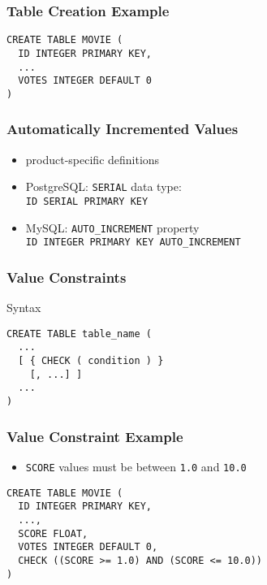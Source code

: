 \documentclass[dvipsnames]{beamer}
\theoremstyle{plain}
\begin{document}
\begin{frame}[fragile]
  \frametitle{Table Creation Example}

  \begin{example}
    \begin{lstlisting}
CREATE TABLE MOVIE (
  ID INTEGER PRIMARY KEY,
  ...
  VOTES INTEGER DEFAULT 0
)
    \end{lstlisting}
  \end{example}
\end{frame}

\begin{frame}[fragile]
  \frametitle{Automatically Incremented Values}

  \begin{itemize}
    \item product-specific definitions

    \bigskip
    \item PostgreSQL: \texttt{SERIAL} data type:\\
      \lstinline!ID SERIAL PRIMARY KEY!

    \smallskip
    \item MySQL: \texttt{AUTO\_INCREMENT} property\\
      \lstinline!ID INTEGER PRIMARY KEY AUTO_INCREMENT!
  \end{itemize}
\end{frame}

\begin{frame}[fragile]
  \frametitle{Value Constraints}

  \begin{block}{Syntax}
    \begin{lstlisting}
CREATE TABLE table_name (
  ...
  [ { CHECK ( condition ) }
    [, ...] ]
  ...
)
    \end{lstlisting}
  \end{block}
\end{frame}

\begin{frame}[fragile]
  \frametitle{Value Constraint Example}

  \begin{example}
    \begin{itemize}
      \item \texttt{SCORE} values must be between \texttt{1.0} and \texttt{10.0}
    \end{itemize}

    \begin{lstlisting}
CREATE TABLE MOVIE (
  ID INTEGER PRIMARY KEY,
  ...,
  SCORE FLOAT,
  VOTES INTEGER DEFAULT 0,
  CHECK ((SCORE >= 1.0) AND (SCORE <= 10.0))
)
    \end{lstlisting}
  \end{example}
\end{frame}
\end{document}
